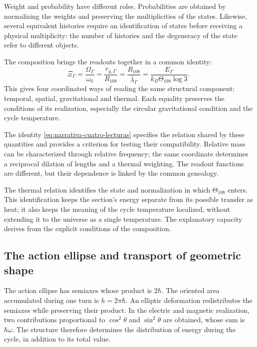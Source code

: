 Weight and probability have different roles. Probabilities
are obtained by normalizing the weights and preserving the multiplicities of the
states. Likewise, several equivalent histories require an identification
of states before receiving a physical multiplicity: the number of histories
and the degeneracy of the state refer to different objects.

The composition brings the readouts together in a common identity:
\begin{equation}
 \boxed{
 \Xi_\Gamma
 =\frac{\Omega_\Gamma}{\omega_0}
 =\frac{r_{g,\Gamma}}{R_{108}}
 =\frac{R_{108}}{\bar\lambda_\Gamma}
 =\frac{E_\Gamma}{k_B\Theta_{108}\log3}.}
 \label{eq:narrativa-cuatro-lecturas}
\end{equation}
This gives four coordinated ways of reading the same structural
component: temporal, spatial, gravitational and thermal. Each equality
preserves the conditions of its realization, especially the circular
gravitational condition and the cycle temperature.

The identity \eqref{eq:narrativa-cuatro-lecturas} specifies the relation
shared by these quantities and provides a criterion for testing their
compatibility. Relative mass can be characterized through relative
frequency; the same coordinate determines a reciprocal dilation of
lengths and a thermal weighting. The readout functions are different,
but their dependence is linked by the common genealogy.

The thermal relation identifies the state and normalization in which
$\Theta_{108}$ enters. This identification keeps the section's energy
separate from its possible transfer as heat; it also keeps
the meaning of the cycle temperature localized, without extending it to the
universe as a single temperature. The explanatory capacity derives from the
explicit conditions of the composition.

\subsection{The action ellipse and transport of geometric shape}
\label{subsec:narrativa-elipse-transporte}

The action ellipse has semiaxes whose product is $2\hbar$. The oriented
area accumulated during one turn is $h=2\pi\hbar$. An elliptic deformation
redistributes the semiaxes while preserving their product. In the
electric and magnetic realization, two contributions proportional to
$\cos^2\theta$ and $\sin^2\theta$ are obtained, whose sum is
$\hbar\omega$. The structure therefore determines the distribution of
energy during the cycle, in addition to its total value.

